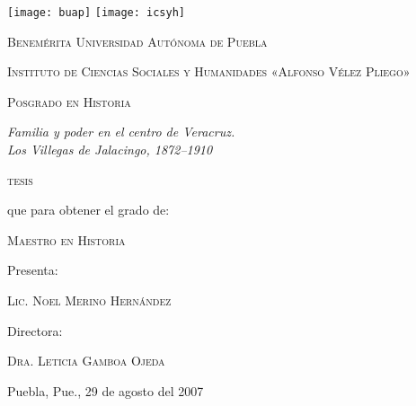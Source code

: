 \documentclass[14pt,twoside,final]{extbook} %
\providecommand\phantomsection{} %
\begin{document}
\setcounter{page}{1}
\parindent=5mm %
\parskip=0mm %
\newpage
\thispagestyle{empty}
\protect\phantomsection
{}
\begin{center}
\begin{minipage}{11cm}
\texttt{[image: buap]}\label{fig:buap} \hfill \texttt{[image: icsyh]}
\label{fig:icsyh}
\end{minipage}
\end{center}
\protect\smallskip
\begin{center}
\large\scshape Benemérita Universidad Autónoma de Puebla
\end{center}
\begin{center}
\large\scshape Instituto de Ciencias Sociales y Humanidades «Alfonso Vélez Pliego»
\end{center}
\begin{center}
\large\scshape Posgrado en Historia
\end{center}
\protect\bigskip
\begin{center}
\Large\itshape Familia y poder en el centro de Veracruz. \\ Los Villegas de Jalacingo, 1872--1910
\end{center}
\protect\bigskip
\begin{center}
\Large\scshape tesis
\end{center}
\protect\bigskip
\begin{center}
que para obtener el grado de:
\end{center}
\begin{center}
\scshape Maestro en Historia
\end{center}
\begin{center}
Presenta:
\end{center}
\begin{center}
\scshape Lic. Noel Merino Hernández
\end{center}
\begin{center}
Directora:
\end{center}
\begin{center}
\scshape Dra. Leticia Gamboa Ojeda
\end{center}
\protect\medskip
\begin{center}
Puebla, Pue., 29 de agosto del 2007
\end{center}
\end{document}
